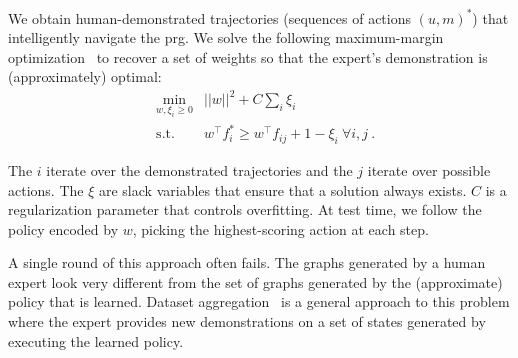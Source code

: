 We obtain human-demonstrated trajectories (sequences of actions $(u,
m)^{*}$) that intelligently navigate the {\sc prg}. We solve the
following maximum-margin optimization~\cite{taskar2005learning} to
recover a set of weights so that the expert's demonstration is
(approximately) optimal:
\begin{align*}
&\min_{w, \xi_i \geq 0} & ||w||^2 + C \sum_i \xi_i\\
&\text{s.t.} & w^{\top}f^*_i \geq w^{\top}f_{ij} + 1 - \xi_{i}\ \forall i, j \ .
\end{align*}

The $i$ iterate over the demonstrated trajectories and the $j$ iterate
over possible actions. The $\xi$ are slack variables that ensure that
a solution always exists. $C$ is a regularization parameter that
controls overfitting. At test time, we follow the policy encoded by
$w$, picking the highest-scoring action at each step.

A single round of this approach often fails. The graphs generated by a
human expert look very different from the set of graphs generated by
the (approximate) policy that is learned. Dataset
aggregation~\cite{dagger} is a general approach to this problem where
the expert provides new demonstrations on a set of states generated by
executing the learned policy.

